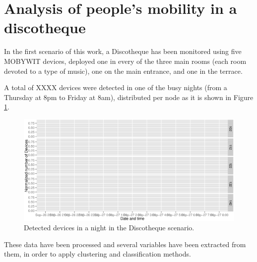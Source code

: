\documentclass[preprint]{elsarticle}
\begin{document}

\section{Analysis of people's mobility in a discotheque}
\label{sec:disco}

In the first scenario of this work, a Discotheque has been monitored using five MOBYWIT devices, deployed one in every of the three main rooms (each room devoted to a type of music), one on the main entrance, and one in the terrace.

A total of XXXX devices were detected in one of the busy nights (from a Thursday at 8pm to Friday at 8am), distributed per node as it is shown in Figure \ref{fig:disco_data}.

\begin{figure}[ht]
	\begin{center}
		\includegraphics[width=\textwidth]{imgs/DISCO/time_series-bars.eps}
		\caption{Detected devices in a night in the Discotheque scenario.}
		\label{fig:disco_data}
	\end{center}
\end{figure}


These data have been processed and several variables have been extracted from them, in order to apply clustering and classification methods.
\end{document}
